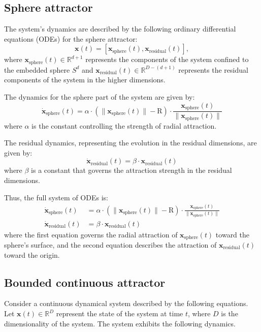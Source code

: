 \documentclass{article}
\theoremstyle{definition} \newtheorem{definition}{Definition}  \newtheorem{example}{Example}
\theoremstyle{remark} \newtheorem{remark}{Remark}
\newcounter{ct}
\begin{document}
\subsection{Sphere attractor}\label{sec:sa}
The system's dynamics are described by the following ordinary differential equations (ODEs) for the sphere attractor:
\begin{equation}
 \mathbf{x}(t) = \left[ \mathbf{x}_{\text{sphere}}(t), \mathbf{x}_{\text{residual}}(t) \right],
\end{equation}
 where \( \mathbf{x}_{\text{sphere}}(t) \in \mathbb{R}^{d+1} \) represents the components of the system confined to the embedded sphere \( S^d \) and \( \mathbf{x}_{\text{residual}}(t) \in \mathbb{R}^{D - (d+1)} \) represents the residual components of the system in the higher dimensions.

The dynamics for the sphere part of the system are given by:
\[
\dot{\mathbf{x}}_{\text{sphere}}(t) = \alpha \cdot \left( \| \mathbf{x}_{\text{sphere}}(t) \| - \text{R} \right) \cdot \frac{\mathbf{x}_{\text{sphere}}(t)}{\|\mathbf{x}_{\text{sphere}}(t)\|}
\]
where \( \alpha \) is the constant controlling the strength of radial attraction. 

The residual dynamics, representing the evolution in the residual dimensions, are given by:
\[
\dot{\mathbf{x}}_{\text{residual}}(t) = \beta \cdot \mathbf{x}_{\text{residual}}(t)
\]
where \( \beta \) is a constant that governs the attraction strength in the residual dimensions.

Thus, the full system of ODEs is:
\[
\begin{aligned}
\dot{\mathbf{x}}_{\text{sphere}}(t) &= \alpha \cdot \left( \| \mathbf{x}_{\text{sphere}}(t) \| - \text{R} \right) \cdot \frac{\mathbf{x}_{\text{sphere}}(t)}{\|\mathbf{x}_{\text{sphere}}(t)\|} \\
\dot{\mathbf{x}}_{\text{residual}}(t) &= \beta \cdot \mathbf{x}_{\text{residual}}(t)
\end{aligned}
\]
where the first equation governs the radial attraction of \( \mathbf{x}_{\text{sphere}}(t) \) toward the sphere's surface, and the second equation describes the attraction of \( \mathbf{x}_{\text{residual}}(t) \) toward the origin.


\subsection{Bounded continuous attractor}\label{sec:bca}
Consider a continuous dynamical system described by the following equations. Let \( \mathbf{x}(t) \in \mathbb{R}^D \) represent the state of the system at time \( t \), where \( D \) is the dimensionality of the system.
The system exhibits the following dynamics.
\end{document}
